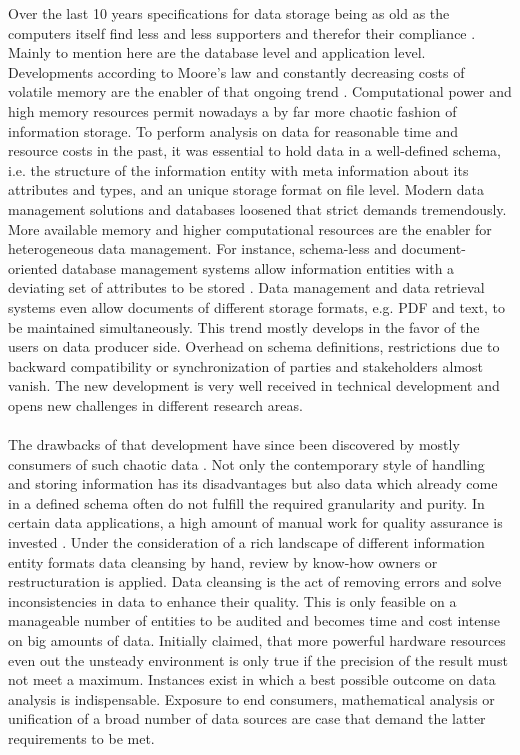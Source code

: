 Over the last 10 years specifications for data storage being as old as the computers itself find less and less supporters and therefor their compliance \cite{andlinger_2013}. Mainly to mention here are the database level and application level. Developments according to Moore's law \cite[p. 7f f., p. 87 ff.]{brock_2006} and constantly decreasing  costs of volatile memory are the enabler of that ongoing trend \cite{rhines_2016}. Computational power and high memory resources permit nowadays a by far more chaotic fashion of information storage. To perform analysis on data for reasonable time and resource costs in the past, it was essential to hold data in a well-defined schema, i.e. the structure of the information entity with meta information about its attributes and types, and an unique storage format on file level. Modern data management solutions and databases loosened that strict demands tremendously. More available memory and higher computational resources are the enabler for heterogeneous data management. For instance, schema-less and document-oriented database management systems allow information entities with a deviating set of attributes to be stored \cite{hills_2016}. Data management and data retrieval systems even allow documents of different storage formats, e.g. PDF and text, to be maintained simultaneously. This trend mostly develops in the favor of the users on data producer side. Overhead on schema definitions, restrictions due to backward compatibility or synchronization of parties and stakeholders almost vanish. The new development is very well received in technical development and opens new challenges in different research areas.
\\\\
The drawbacks of that development have since been discovered by mostly consumers of such chaotic data \cite{lombardo_di_nitto_ardagna_2012}. Not only the contemporary style of handling and storing information has its disadvantages but also data which already come in a defined schema often do not fulfill the required granularity and purity. In certain data applications, a high amount of manual work for quality assurance is invested \cite{wang_strong_1996}. Under the consideration of a rich landscape of different information entity formats data cleansing by hand, review by know-how owners or restructuration is applied. Data cleansing is the act of removing errors and solve inconsistencies in data to enhance their quality. This is only feasible on a manageable number of entities to be audited and becomes time and cost intense on big amounts of data. Initially claimed, that more powerful hardware resources even out the unsteady environment is only true if the precision of the result must not meet a maximum. Instances exist in which a best possible outcome on data analysis is indispensable. Exposure to end consumers, mathematical analysis or unification of a broad number of data sources are case that demand the latter requirements to be met. 

